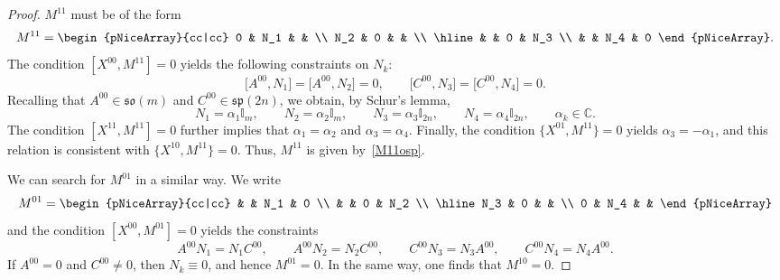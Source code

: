 \documentclass[10pt,a4paper]{amsart}
\numberwithin{equation}{section}
\theoremstyle{definition}
\def\so{\mathfrak{so}}
\def\sp{\mathfrak{sp}}
\begin{document}
\begin{proof}
	$M^{11}$ must be of the form
	\begin{equation*}
		M^{11} =
		\begin{pNiceArray}{cc|cc}
			0 & N_1 & &
			\\
			N_2 & 0 & &
			\\ \hline
			& & 0 & N_3
			\\
			& & N_4 & 0
		\end{pNiceArray}.
	\end{equation*}
	The condition $[X^{00}, M^{11}] = 0$ yields the following constraints on $N_k$:
	\begin{equation*}
		\bigl[A^{00},N_1\bigr] = \bigl[A^{00},N_2\bigr] = 0, \qquad \bigl[C^{00},N_3\bigr] = \bigl[C^{00},N_4\bigr] = 0.
	\end{equation*}
	Recalling that $ A^{00} \in \so(m) $ and $ C^{00} \in \sp(2n)$, we obtain, by Schur's lemma,
	\begin{equation*}
		N_1 = \alpha_1 \mathbb{I}_m, \qquad N_2 = \alpha_2 \mathbb{I}_m, \qquad
		N_3 = \alpha_3 \mathbb{I}_{2n}, \qquad N_4 = \alpha_4 \mathbb{I}_{2n}, \qquad \alpha_k \in \mathbb{C}.
	\end{equation*}
	The condition $[X^{11}, M^{11}] = 0$ further implies that $\alpha_1 = \alpha_2$ and $\alpha_3 = \alpha_4$. Finally, the condition $\bigl\{ X^{01}, M^{11}\bigr\} = 0$ yields $ \alpha_3 = -\alpha_1$, and this relation is consistent with $\bigl\{ X^{10}, M^{11}\bigr\} = 0$.
	Thus, $M^{11}$ is given by~\eqref{M11osp}.

	We can search for $M^{01}$ in a similar way. We write
\begin{equation*}
	M^{01} =
	\begin{pNiceArray}{cc|cc}
		& & N_1 & 0
		\\
		& & 0 & N_2 \\ \hline
		N_3 & 0 & &
		\\
		0 & N_4 & &
	\end{pNiceArray}
\end{equation*}
and the condition $[X^{00}, M^{01}] = 0$ yields the constraints
\[
	A^{00} N_1 = N_1 C^{00}, \qquad A^{00} N_2 = N_2 C^{00}, \qquad
	C^{00} N_3 = N_3 A^{00}, \qquad C^{00} N_4 = N_4 A^{00}.
\]
If $ A^{00} = 0 $ and $ C^{00} \neq 0$, then $ N_k \equiv 0$, and hence $ M^{01} = 0.$
In the same way, one finds that $M^{10} = 0$.
\end{proof}
\end{document}
